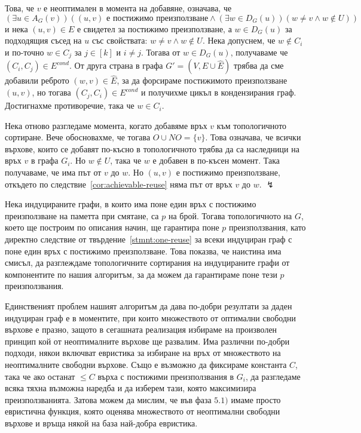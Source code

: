 \documentclass[12pt,twoside,a4paper]{article}
\begin{document}
\begin{statement}
		Това, че $v$ е неоптимален в момента на добавяне, означава, че $(\exists u \in A_G(v))((u,v)\text{ е постижимо преизползване} \land (\exists w \in D_G(u))(w \neq v \land w \notin U))$ и нека $(u,v) \in E$ е свидетел за постижимо преизползване, а $w \in D_G(u)$ за подходящия съсед на $u$ със свойствата: $w \neq v \land w \notin U$. Нека допуснем, че $w \notin C_i$ и по-точно $w \in C_j$ за $j \in [k]$ и $i \neq j$. Тогава от $w \in D_G(u)$, получаваме че $(C_i, C_j) \in E^{cond}$. От друга страна в графа $G'=(V,E \cup \hat{E})$ трябва да сме добавили реброто $(w,v) \in \hat{E}$, за да форсираме постижимото преизползване $(u,v)$, но тогава $(C_j,C_i) \in E^{cond}$ и получихме цикъл в кондензирания граф. Достигнахме противоречие, така че $w \in C_i$.
		
		Нека отново разгледаме момента, когато добавяме връх $v$ към топологичното сортиране. Вече обосновахме, че тогава $O \cup NO = \{v\}$. Това означава, че всички върхове, които се добавят по-късно в топологичното трябва да са наследници на връх $v$ в графа $G_i$. Но $w \notin U$, така че $w$ е добавен в по-късен момент. Така получаваме, че има път от $v$ до $w$. Но $(u,v)$ е постижимо преизползване, откъдето по следствие~\ref{cor:achievable-reuse} няма път от връх $v$ до $w$. $\lightning$
	\end{statement}
	
	Нека индуцираните графи, в които има поне един връх с постижимо преизползване на паметта при смятане, са $p$ на брой. Тогава топологичното на $G$, което ще построим по описания начин, ще гарантира поне $p$ преизползвания, като директно следствие от твърдение~\ref{stmnt:one-reuse} за всеки индуциран граф с поне един връх с постижимо преизползване. Това показва, че наистина има смисъл, да разглеждаме топологичните сортирания на индуцираните графи от компонентите по нашия алгоритъм, за да можем да гарантираме поне тези $p$ преизползвания.
	
	Единственият проблем нашият алгоритъм да дава по-добри резултати за даден индуциран граф е в моментите, при които множеството от оптимални свободни върхове е празно, защото в сегашната реализация избираме на произволен принцип кой от неоптималните върхове ще развалим. Има различни по-добри подходи, някои включват евристика за избиране на връх от множеството на неоптималните свободни върхове. Също е възможно да фиксираме константа $C$, така че ако останат $\le C$ върха с постижими преизползвания в $G_i$, да разгледаме всяка тяхна възможна наредба и да изберем тази, която максимизира преизползванията. Затова можем да мислим, че във фаза $5.1)$ имаме просто евристична функция, която оценява множеството от неоптимални свободни върхове и връща някой на база най-добра евристика.
	
\end{document}
